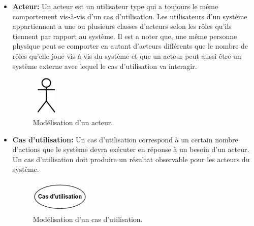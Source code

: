 \begin{itemize}
	\item \textbf{Acteur:}
	Un acteur est un utilisateur type qui a toujours le même comportement vis-à-vis d'un cas d'utilisation. Les utilisateurs d'un système appartiennent a une ou plusieurs classes d'acteurs selon les rôles qu'ils tiennent par rapport au système. Il est a noter que, une même personne physique peut se comporter en autant d'acteurs différents que le nombre de rôles qu'elle joue vis-à-vis du système et que un acteur peut aussi être un système externe avec lequel le cas d'utilisation va interagir.\cite{UML}
	\begin{figure}[H]
		\centering
		\includegraphics[height=55pt,width=40pt]{img/chapter3/acteur.png}
		\caption{Modélisation d'un acteur.}
	\end{figure}
	\item \textbf{Cas d'utilisation:}
	Un cas d'utilisation correspond à un certain nombre d'actions que le système devra exécuter en réponse à un besoin d'un acteur. Un cas d'utilisation doit produire un résultat observable pour les acteurs du système.\cite{UML}
    \begin{figure}[H]
	   \centering
	   \includegraphics[height=45pt,width=80pt]{img/chapter3/casdutilisation.png}
	   \caption{Modélisation d'un cas d'utilisation.}
    \end{figure}
\end{itemize}

